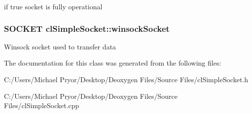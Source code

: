 \label{classcl_simple_socket_afa5ce1a66de16e6184770e528fd0a03f}
if true socket is fully operational \hypertarget{classcl_simple_socket_a109af953439a5f88d198f3764e0077b2}{
\subsubsection[{winsockSocket}]{\setlength{\rightskip}{0pt plus 5cm}SOCKET {\bf clSimpleSocket::winsockSocket}}}
\label{classcl_simple_socket_a109af953439a5f88d198f3764e0077b2}
Winsock socket used to transfer data 

The documentation for this class was generated from the following files:\begin{DoxyCompactItemize}
\item 
C:/Users/Michael Pryor/Desktop/Deoxygen Files/Source Files/clSimpleSocket.h\item 
C:/Users/Michael Pryor/Desktop/Deoxygen Files/Source Files/clSimpleSocket.cpp\end{DoxyCompactItemize}
